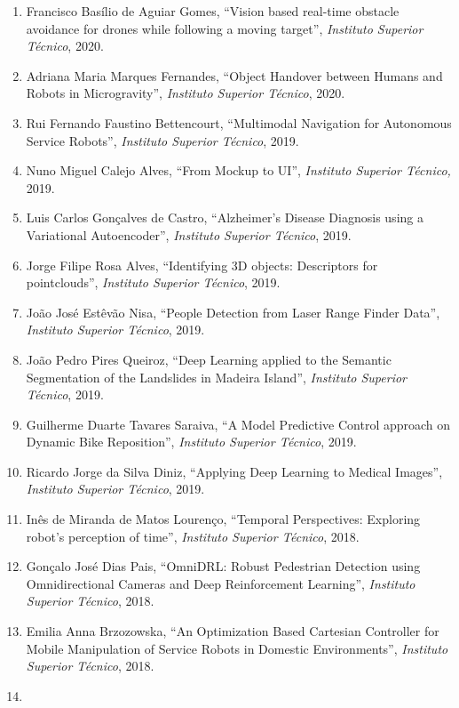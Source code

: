 \documentclass[
]{article}
\begin{document}
\begin{enumerate}
  André Rosa de Sousa Porfírio Correia, ``Software for a Service
  Robot'', \emph{Universidade da Beira Interior}, 2020.
\item
  Francisco Basílio de Aguiar Gomes, ``Vision based real-time obstacle
  avoidance for drones while following a moving target'',
  \emph{Instituto Superior Técnico}, 2020.
\item
  Adriana Maria Marques Fernandes, ``Object Handover between Humans and
  Robots in Microgravity'', \emph{Instituto Superior Técnico}, 2020.
\item
  Rui Fernando Faustino Bettencourt, ``Multimodal Navigation for
  Autonomous Service Robots'', \emph{Instituto Superior Técnico}, 2019.
\item
  Nuno Miguel Calejo Alves, ``From Mockup to UI'', \emph{Instituto
  Superior Técnico,} 2019.
\item
  Luis Carlos Gonçalves de Castro, ``Alzheimer's Disease Diagnosis using
  a Variational Autoencoder'', \emph{Instituto Superior Técnico}, 2019.
\item
  Jorge Filipe Rosa Alves, ``Identifying 3D objects: Descriptors for
  pointclouds'', \emph{Instituto Superior Técnico}, 2019.
\item
  João José Estêvão Nisa, ``People Detection from Laser Range Finder
  Data'', \emph{Instituto Superior Técnico}, 2019.
\item
  João Pedro Pires Queiroz, ``Deep Learning applied to the Semantic
  Segmentation of the Landslides in Madeira Island'', \emph{Instituto
  Superior Técnico}, 2019.
\item
  Guilherme Duarte Tavares Saraiva, ``A Model Predictive Control
  approach on Dynamic Bike Reposition'', \emph{Instituto Superior
  Técnico}, 2019.
\item
  Ricardo Jorge da Silva Diniz, ``Applying Deep Learning to Medical
  Images'', \emph{Instituto Superior Técnico}, 2019.
\item
  Inês de Miranda de Matos Lourenço, ``Temporal Perspectives: Exploring
  robot's perception of time'', \emph{Instituto Superior Técnico}, 2018.
\item
  Gonçalo José Dias Pais, ``OmniDRL: Robust Pedestrian Detection using
  Omnidirectional Cameras and Deep Reinforcement Learning'',
  \emph{Instituto Superior Técnico}, 2018.
\item
  Emilia Anna Brzozowska, ``An Optimization Based Cartesian Controller
  for Mobile Manipulation of Service Robots in Domestic Environments'',
  \emph{Instituto Superior Técnico}, 2018.
\item

\end{enumerate}
\end{document}

